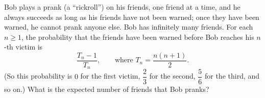 Bob plays a prank (a ``rickroll'') on his friends, one friend at a time, and he always succeeds as long as his friends have not been warned; once they have been warned, he cannot prank anyone else. Bob has infinitely many friends. For each $n\ge1$, the probability that the friends have been warned before Bob reaches his $n$-th victim is
\[\dfrac{T_n-1}{T_n},\qquad\text{where }T_n=\dfrac{n(n+1)}{2}.\]
(So this probability is $0$ for the first victim, $\dfrac23$ for the second, $\dfrac56$ for the third, and so on.) What is the expected number of friends that Bob pranks?
